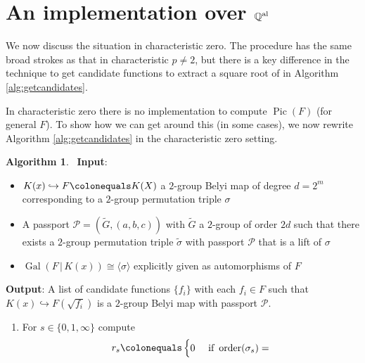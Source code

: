 \documentclass{dcthesis}
\newcommand{\wt}[1]{\widetilde{#1}}
\newcommand{\QQal}{{\mathbb Q}^{\textup{al}}}
\DeclareMathOperator{\Pic}{Pic}
\DeclareMathOperator{\order}{order}
\DeclareMathOperator{\Gal}{Gal}
\numberwithin{equation}{section}
\theoremstyle{definition}
\newtheorem{alg}[equation]{Algorithm}
\theoremstyle{remark}
\begin{document}
{{  \section{An implementation over $\QQal$}{
    \label{sec:characteristiczero}
    We now discuss the situation in
    characteristic zero.
    The procedure has the same broad strokes as
    that in characteristic $p\neq 2$,
    but there is a key difference
    in the technique to
    get candidate functions
    to extract a square root of in
    Algorithm
    \ref{alg:getcandidates}.
    \par
    In characteristic zero
    there is no implementation
    to compute $\Pic(F)$
    (for general $F$).
    To show how we can get around
    this (in some cases),
    we now rewrite
    Algorithm
    \ref{alg:getcandidates}
    in the characteristic zero setting.
    \begin{alg}
      \label{alg:charzero}
      \,
      \newline
      \textbf{Input}:
      \begin{itemize}
        \item 
          $K(x)\hookrightarrow F\colonequals K(X)$
          a $2$-group Belyi map
          of degree $d=2^m$
          corresponding to a $2$-group
          permutation triple $\sigma$
        \item
          A passport
          $\mathcal{P}=(\wt{G},(a,b,c))$
          with $\wt{G}$ a $2$-group of order
          $2d$ such that there
          exists a
          $2$-group permutation triple
          $\wt{\sigma}$ with passport
          $\mathcal{P}$
          that is a lift of
          $\sigma$
        \item
          $\Gal(F\,|\,K(x))\cong
          \langle\sigma\rangle$
          explicitly given
          as automorphisms of $F$
      \end{itemize}
      \textbf{Output}:
      A list of candidate functions
      $\{f_i\}$ with each $f_i\in F$
      such that
      $K(x)\hookrightarrow F(\sqrt{f_i})$
      is a $2$-group Belyi map
      with passport $\mathcal{P}$.
      \begin{enumerate}
        \item\label{alg:charzero_setup}
          For $s\in\{0,1,\infty\}$
          compute
          \begin{align}
            \label{eqn:ramcoeffs}
            r_s\colonequals
            \begin{cases}
              0&
              \text{ if }
              \order(\sigma_s)=

\end{cases}
\end{align}
\end{enumerate}
\end{alg}}}}
\end{document}
